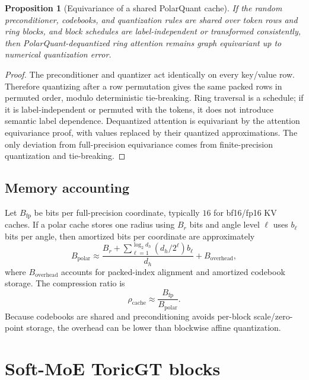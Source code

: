 \documentclass[11pt]{article}
\theoremstyle{definition}
\theoremstyle{plain}
\newtheorem{proposition}[definition]{Proposition}
\theoremstyle{remark}
\numberwithin{equation}{section}
\begin{document}
\begin{proposition}[Equivariance of a shared PolarQuant cache]
If the random preconditioner, codebooks, and quantization rules are shared over token rows and ring blocks, and block schedules are label-independent or transformed consistently, then PolarQuant-dequantized ring attention remains graph equivariant up to numerical quantization error.
\end{proposition}

\begin{proof}
The preconditioner and quantizer act identically on every key/value row.  Therefore quantizing after a row permutation gives the same packed rows in permuted order, modulo deterministic tie-breaking.  Ring traversal is a schedule; if it is label-independent or permuted with the tokens, it does not introduce semantic label dependence.  Dequantized attention is equivariant by the attention equivariance proof, with values replaced by their quantized approximations.  The only deviation from full-precision equivariance comes from finite-precision quantization and tie-breaking.
\end{proof}

\subsection{Memory accounting}

Let $B_{\mathrm{fp}}$ be bits per full-precision coordinate, typically $16$ for bf16/fp16 KV caches.  If a polar cache stores one radius using $B_r$ bits and angle level $\ell$ uses $b_\ell$ bits per angle, then amortized bits per coordinate are approximately
\begin{equation}
  B_{\mathrm{polar}}\approx \frac{B_r+\sum_{\ell=1}^{\log_2 d_h}(d_h/2^\ell)b_\ell}{d_h}+B_{\mathrm{overhead}},
\end{equation}
where $B_{\mathrm{overhead}}$ accounts for packed-index alignment and amortized codebook storage.  The compression ratio is
\begin{equation}
  \rho_{\mathrm{cache}}\approx \frac{B_{\mathrm{fp}}}{B_{\mathrm{polar}}}.
\end{equation}
Because codebooks are shared and preconditioning avoids per-block scale/zero-point storage, the overhead can be lower than blockwise affine quantization.


\section{Soft-MoE ToricGT blocks}
\end{document}
